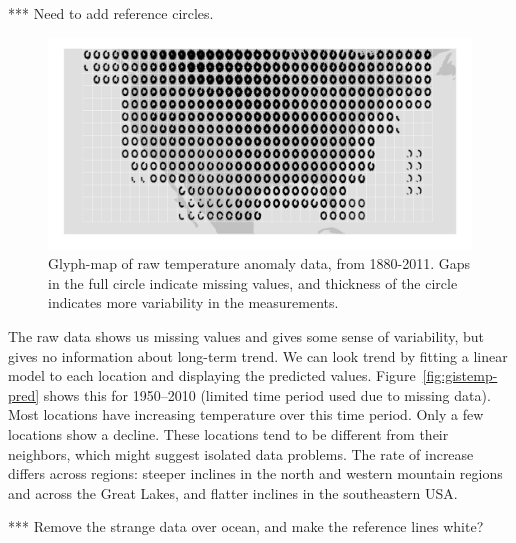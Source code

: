 \documentclass[oneside]{article}
\begin{document}
*** Need to add reference circles.

\begin{figure}[htbp]
  \centering

  \includegraphics[width=1\linewidth]{gistemp-polar-raw}

  \caption{Glyph-map of raw temperature anomaly data, from 1880-2011. Gaps in the full circle indicate missing values, and thickness of the circle indicates more variability in the measurements.}
  \label{fig:gistemp-raw}
\end{figure}

The raw data shows us missing values and gives some sense of variability, but gives no information about long-term trend. We can look trend by fitting a linear model to each location and displaying the predicted values. Figure~\ref{fig:gistemp-pred} shows this for 1950--2010 (limited time period used due to missing data). Most locations have increasing temperature over this time period. Only a few locations show a decline. These locations tend to be different from their neighbors, which might suggest isolated data problems. The rate of increase differs across regions: steeper inclines in the north and western mountain regions and across the Great Lakes, and flatter inclines in the southeastern USA.

*** Remove the strange data over ocean, and make the reference lines white?
\end{document}
